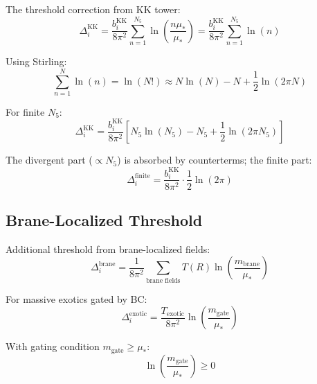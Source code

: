 \documentclass[11pt,a4paper]{article}
\theoremstyle{definition}
\begin{document}
The threshold correction from KK tower:
\begin{equation}
\label{eq:kk_threshold}
\Delta_i^{\text{KK}} = \frac{b_i^{\text{KK}}}{8\pi^2} \sum_{n=1}^{N_5} \ln\left(\frac{n \mu_*}{\mu_*}\right) = \frac{b_i^{\text{KK}}}{8\pi^2} \sum_{n=1}^{N_5} \ln(n)
\end{equation}

Using Stirling:
\begin{equation}
\label{eq:stirling}
\sum_{n=1}^{N} \ln(n) = \ln(N!) \approx N\ln(N) - N + \frac{1}{2}\ln(2\pi N)
\end{equation}

For finite $N_5$:
\begin{equation}
\label{eq:kk_finite}
\Delta_i^{\text{KK}} = \frac{b_i^{\text{KK}}}{8\pi^2} \left[N_5 \ln(N_5) - N_5 + \frac{1}{2}\ln(2\pi N_5)\right]
\end{equation}

The divergent part ($\propto N_5$) is absorbed by counterterms; the finite part:
\begin{equation}
\label{eq:kk_finite_part}
\Delta_i^{\text{finite}} = \frac{b_i^{\text{KK}}}{8\pi^2} \cdot \frac{1}{2}\ln(2\pi)
\end{equation}

\subsection{Brane-Localized Threshold}
\label{subsec:brane_threshold}

Additional threshold from brane-localized fields:
\begin{equation}
\label{eq:brane_threshold}
\Delta_i^{\text{brane}} = \frac{1}{8\pi^2} \sum_{\text{brane fields}} T(R) \ln\left(\frac{m_{\text{brane}}}{\mu_*}\right)
\end{equation}

For massive exotics gated by BC:
\begin{equation}
\label{eq:exotic_threshold}
\Delta_i^{\text{exotic}} = \frac{T_{\text{exotic}}}{8\pi^2} \ln\left(\frac{m_{\text{gate}}}{\mu_*}\right)
\end{equation}

With gating condition $m_{\text{gate}} \geq \mu_*$:
\begin{equation}
\label{eq:exotic_positive}
\ln\left(\frac{m_{\text{gate}}}{\mu_*}\right) \geq 0
\end{equation}
\end{document}

